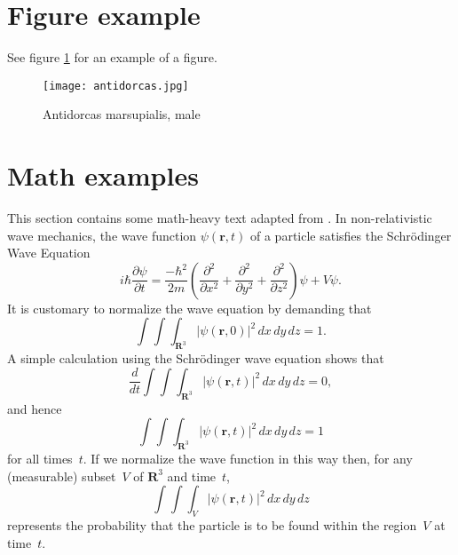 \section{Figure example}

See figure \ref{figure\arabic{figurecounter}} for an example of a figure.

\begin{figure}
\texttt{[image: antidorcas.jpg]}
\caption{Antidorcas marsupialis, male}
\label{figure\arabic{figurecounter}}
\end{figure}
\clearpage
\section{Math examples}

This section contains some math-heavy text adapted from \iftoggle{usebiblatex}{\textcite{dwilkins1995}}{\citet{dwilkins1995}}.
In non-relativistic wave mechanics, the wave function $\psi(\mathbf{r},t)$ of a particle satisfies the Schrödinger Wave Equation
%
\begin{equation}
 i\hbar\frac{\partial \psi}{\partial t}
  = \frac{-\hbar^2}{2m} \left(
    \frac{\partial^2}{\partial x^2}
    + \frac{\partial^2}{\partial y^2}
    + \frac{\partial^2}{\partial z^2}
  \right) \psi + V \psi.
\end{equation}
%
It is customary to normalize the wave equation by
demanding that
%
\begin{equation}
\int \!\!\! \int \!\!\! \int_{\textbf{R}^3}
      \left| \psi(\mathbf{r},0) \right|^2\,dx\,dy\,dz = 1.
\end{equation}
%
A simple calculation using the Schr\"{o}dinger wave
equation shows that
%
\begin{equation}
\frac{d}{dt} \int \!\!\! \int \!\!\! \int_{\textbf{R}^3}
      \left| \psi(\mathbf{r},t) \right|^2\,dx\,dy\,dz = 0,
\end{equation}
%
and hence
%
\begin{equation}
\int \!\!\! \int \!\!\! \int_{\textbf{R}^3}
      \left| \psi(\mathbf{r},t) \right|^2\,dx\,dy\,dz = 1
\end{equation}
%
for all times~$t$. If we normalize the wave function in this
way then, for any (measurable) subset~$V$ of $\textbf{R}^3$
and time~$t$,
%
\begin{equation}
\int \!\!\! \int \!\!\! \int_V
      \left| \psi(\mathbf{r},t) \right|^2\,dx\,dy\,dz
\end{equation}
%
represents the probability that the particle is to be found
within the region~$V$ at time~$t$.

